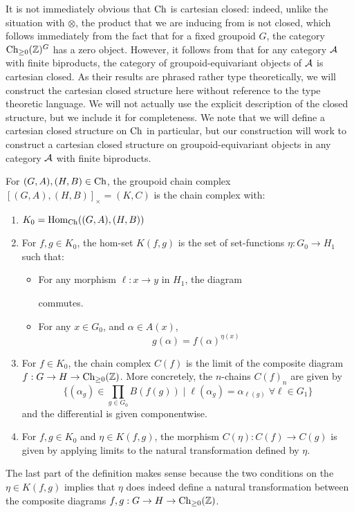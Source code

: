 \documentclass[12pt]{amsart}
\begin{document}
It is not immediately obvious that ${\mathrm{Ch}}$ is cartesian closed: indeed, unlike the situation with $\otimes$, the product 
that we are inducing from is not closed, which follows immediately from the fact that for a fixed groupoid $G$, the category $\mathrm{Ch}_{\ge 0}(\mathbb{Z})^G$ has a zero object.
However, it follows from \cite[Theorem 9.11, Example 9.19]{Nunes2024} that for any category $\mathcal{A}$ with finite biproducts, the category of groupoid-equivariant objects of $\mathcal{A}$ is cartesian closed.
As their results are phrased rather type theoretically, we will construct the cartesian closed structure here without reference to the type theoretic language. 
We will not actually use the explicit description of the closed structure, but we include it for completeness. 
We note that we will define a cartesian closed structure on ${\mathrm{Ch}}$ in particular, but our construction will work to construct a cartesian closed structure on groupoid-equivariant objects in any category $\mathcal{A}$ with finite biproducts. 
\begin{definition}\label{dfn:cartesian-mapping-groupoid-chain-complex}
	For $(G,A),(H,B) \in {\mathrm{Ch}}$, the groupoid chain complex $[(G,A),(H,B)]_\times = (K,C)$ is the chain complex with:
	\begin{enumerate}
		\item $K_0 = \mathrm{Hom}_{{\mathrm{Ch}}}((G,A),(H,B))$
		\item
		For $f,g \in K_0$, the hom-set $K(f,g)$ is the set of set-functions $\eta: G_0 \to H_1$ such that:
		\begin{itemize}
			\item For any morphism $\ell: x \to y$ in $H_1$, the diagram
			\begin{center}
			\end{center}
			commutes. 
			\item For any $x \in G_0$, and $\alpha \in A(x)$, 
			$$g(\alpha) = f(\alpha)^{\eta(x)}$$
		\end{itemize}
		\item For $f \in K_0$, the chain complex $C(f)$ is the limit of the composite diagram $f: G \to H \to \mathrm{Ch}_{\ge 0}(\mathbb{Z})$. More concretely, the $n$-chains $C(f)_n$ are given by
		$$\{(\alpha_g)\in \prod_{g \in G_0} B(f(g)) \; | \; \ell(\alpha_g) = \alpha_{\ell(g)} \; \forall \ell \in G_1 \}$$
		and the differential is given componentwise.
		\item For $f,g \in K_0$ and $\eta \in K(f,g)$, the morphism $C(\eta): C(f) \to C(g)$ is given by applying limits to the natural transformation defined by $\eta$. 
	\end{enumerate}
	The last part of the definition makes sense because the two conditions on the $\eta \in K(f,g)$ implies that $\eta$ does indeed define a natural transformation between the composite diagrams $f,g: G \to H \to \mathrm{Ch}_{\ge 0}(\mathbb{Z})$. 
\end{definition}
\end{document}
